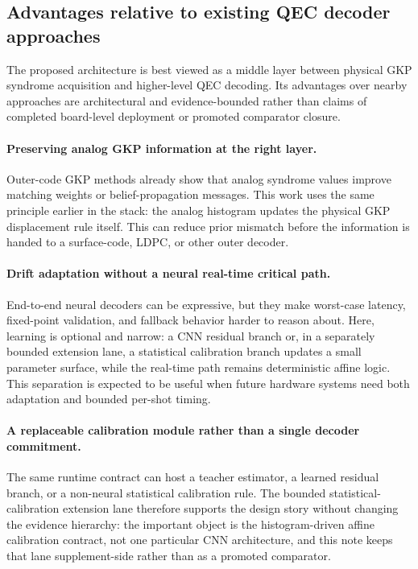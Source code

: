 \documentclass[11pt]{article}
\begin{document}
\subsection{Advantages relative to existing QEC decoder approaches}

The proposed architecture is best viewed as a middle layer between physical
GKP syndrome acquisition and higher-level QEC decoding.  Its advantages over
nearby approaches are architectural and evidence-bounded rather than claims of
completed board-level deployment or promoted comparator closure.

\paragraph{Preserving analog GKP information at the right layer.}
Outer-code GKP methods already show that analog syndrome values improve
matching weights or belief-propagation messages.  This work uses the same
principle earlier in the stack: the analog histogram updates the physical GKP
displacement rule itself.  This can reduce prior mismatch before the
information is handed to a surface-code, LDPC, or other outer decoder.

\paragraph{Drift adaptation without a neural real-time critical path.}
End-to-end neural decoders can be expressive, but they make worst-case latency,
fixed-point validation, and fallback behavior harder to reason about.  Here,
learning is optional and narrow: a CNN residual branch or, in a separately
bounded extension lane, a statistical calibration branch updates a small
parameter surface, while the real-time path remains deterministic affine
logic.  This separation is expected to be useful when future hardware systems
need both adaptation and bounded per-shot timing.

\paragraph{A replaceable calibration module rather than a single decoder
commitment.}
The same runtime contract can host a teacher estimator, a learned residual
branch, or a non-neural statistical calibration rule.  The bounded
statistical-calibration extension lane therefore supports the design story
without changing the evidence hierarchy: the important object is the
histogram-driven affine calibration contract, not one particular CNN
architecture, and this note keeps that lane supplement-side rather than as a
promoted comparator.
\end{document}
